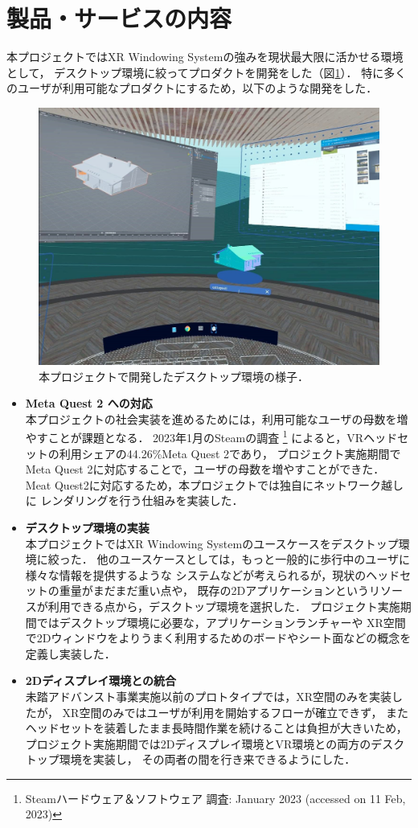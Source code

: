\documentclass[12pt,a4paper]{jsarticle}
\begin{document}
\section{製品・サービスの内容}
本プロジェクトではXR Windowing Systemの強みを現状最大限に活かせる環境として，
デスクトップ環境に絞ってプロダクトを開発をした（図\ref{fig:zen}）．
特に多くのユーザが利用可能なプロダクトにするため，以下のような開発をした．

\begin{figure}[htbp]
  \centering
  \includegraphics[keepaspectratio, width=0.6\linewidth]{fig/zen.png}
  \caption{本プロジェクトで開発したデスクトップ環境の様子．}
  \label{fig:zen}
\end{figure}

\begin{itemize}
  \item \textbf{Meta Quest 2 への対応} \\
        本プロジェクトの社会実装を進めるためには，利用可能なユーザの母数を増やすことが課題となる．
        2023年1月のSteamの調査
        \footnote{Steamハードウェア＆ソフトウェア 調査: January 2023 (accessed on 11 Feb, 2023)}
        によると，VRヘッドセットの利用シェアの44.26\%Meta Quest 2であり，
        プロジェクト実施期間でMeta Quest 2に対応することで，ユーザの母数を増やすことができた．
        Meat Quest2に対応するため，本プロジェクトでは独自にネットワーク越しに
        レンダリングを行う仕組みを実装した．
  \item \textbf{デスクトップ環境の実装} \\
        本プロジェクトではXR Windowing Systemのユースケースをデスクトップ環境に絞った．
        他のユースケースとしては，もっと一般的に歩行中のユーザに様々な情報を提供するような
        システムなどが考えられるが，現状のヘッドセットの重量がまだまだ重い点や，
        既存の2Dアプリケーションというリソースが利用できる点から，デスクトップ環境を選択した．
        プロジェクト実施期間ではデスクトップ環境に必要な，アプリケーションランチャーや
        XR空間で2Dウィンドウをよりうまく利用するためのボードやシート面などの概念を定義し実装した．
  \item \textbf{2Dディスプレイ環境との統合} \\
        未踏アドバンスト事業実施以前のプロトタイプでは，XR空間のみを実装したが，
        XR空間のみではユーザが利用を開始するフローが確立できず，
        またヘッドセットを装着したまま長時間作業を続けることは負担が大きいため，
        プロジェクト実施期間では2Dディスプレイ環境とVR環境との両方のデスクトップ環境を実装し，
        その両者の間を行き来できるようにした．
\end{itemize}
\end{document}
